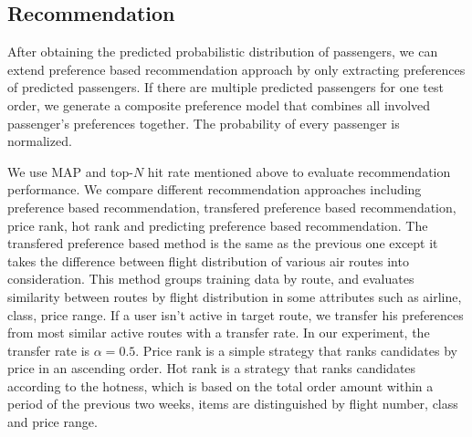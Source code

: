 \documentclass{sig-alternate-05-2015}
\begin{document}
\subsection{Recommendation}
After obtaining the predicted probabilistic distribution of passengers, we can extend preference based recommendation approach by only extracting preferences of predicted passengers. If there are multiple predicted passengers for one test order, we generate a composite preference model that combines all involved passenger's preferences together. The probability of every passenger is normalized.\par
We use MAP and top-$N$ hit rate mentioned above to evaluate recommendation performance. We compare different recommendation approaches including preference based recommendation, transfered preference based recommendation, price rank, hot rank and predicting preference based recommendation. The transfered preference based method is the same as the previous one except it takes the difference between flight distribution of various air routes into consideration. This method groups training data by route, and evaluates similarity between routes by flight distribution in some attributes such as airline, class, price range. If a user isn't active in target route, we transfer his preferences from most similar active routes with a transfer rate. In our experiment, the transfer rate is  $ \alpha = 0.5$. Price rank is a simple strategy that ranks candidates by price in an ascending order. Hot rank is a strategy that ranks candidates according to the hotness, which is based on the total order amount within a period of the previous two weeks, items are distinguished by flight number, class and price range.\par
\end{document}
